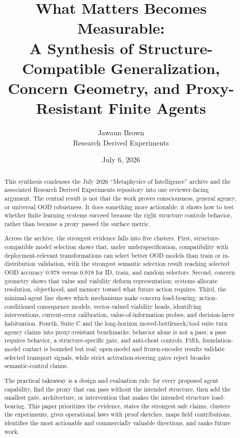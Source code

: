 \documentclass[11pt]{article}
\title{\vspace{-2em}What Matters Becomes Measurable:\\
A Synthesis of Structure-Compatible Generalization, Concern Geometry, and Proxy-Resistant Finite Agents}
\author{Jawaun Brown\\Research Derived Experiments}
\date{July 6, 2026}
\begin{document}
\maketitle

\begin{abstract}
This synthesis condenses the July 2026 ``Metaphysics of Intelligence'' archive
and the associated Research Derived Experiments repository into one
reviewer-facing argument. The central result is not that the work proves
consciousness, general agency, or universal OOD robustness. It does something
more actionable: it shows how to test whether finite learning systems succeed
because the right structure controls behavior, rather than because a proxy
passed the surface metric.

Across the archive, the strongest evidence falls into five clusters. First,
structure-compatible model selection shows that, under underspecification,
compatibility with deployment-relevant transformations can select better OOD
models than train or in-distribution validation, with the strongest semantic
selection result reaching selected OOD accuracy 0.978 versus 0.919 for ID,
train, and random selectors. Second, concern geometry shows that value and
viability deform representation: systems allocate resolution, objecthood, and
memory toward what future action requires. Third, the minimal-agent line shows
which mechanisms make concern load-bearing: action-conditioned consequence
models, vector-valued viability heads, identifying interventions, current-error
calibration, value-of-information probes, and decision-layer habituation.
Fourth, Suite C and the long-horizon moved-bottleneck/tool suite turn agency
claims into proxy-resistant benchmarks: behavior alone is not a pass; a pass
requires behavior, a structure-specific gate, and anti-cheat controls. Fifth,
foundation-model contact is bounded but real: open-model and frozen-encoder
results validate selected transport signals, while strict activation-steering
gates reject broader semantic-control claims.

The practical takeaway is a design and evaluation rule: for every proposed
agent capability, find the proxy that can pass without the intended structure,
then add the smallest gate, architecture, or intervention that makes the
intended structure load-bearing. This paper prioritizes the evidence, states
the strongest safe claims, clusters the experiments, gives operational laws
with proof sketches, maps field contributions, identifies the most actionable
and commercially valuable directions, and ranks future work.
\end{abstract}
\end{document}
